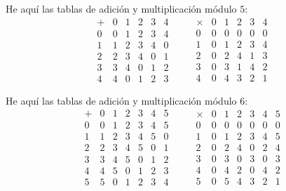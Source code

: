 \documentclass{article}
\begin{document}
\begin{ejemplo}
  He aquí las tablas de adición y multiplicación módulo $5$:
  \[
    \begin{array}{c|ccccc}
      + & 0 & 1 & 2 & 3 & 4 \\
      \hline
      0 & 0 & 1 & 2 & 3 & 4 \\
      1 & 1 & 2 & 3 & 4 & 0 \\
      2 & 2 & 3 & 4 & 0 & 1 \\
      3 & 3 & 4 & 0 & 1 & 2 \\
      4 & 4 & 0 & 1 & 2 & 3
    \end{array}
    \quad\quad
    \begin{array}{c|ccccc}
      \times & 0 & 1 & 2 & 3 & 4 \\
      \hline
      0 & 0 & 0 & 0 & 0 & 0 \\
      1 & 0 & 1 & 2 & 3 & 4 \\
      2 & 0 & 2 & 4 & 1 & 3 \\
      3 & 0 & 3 & 1 & 4 & 2 \\
      4 & 0 & 4 & 3 & 2 & 1
    \end{array}
  \]
\end{ejemplo}

\begin{ejemplo}
  He aquí las tablas de adición y multiplicación módulo $6$:
  \[
    \begin{array}{c|cccccc}
      + & 0 & 1 & 2 & 3 & 4 & 5 \\
      \hline
      0 & 0 & 1 & 2 & 3 & 4 & 5 \\
      1 & 1 & 2 & 3 & 4 & 5 & 0 \\
      2 & 2 & 3 & 4 & 5 & 0 & 1 \\
      3 & 3 & 4 & 5 & 0 & 1 & 2 \\
      4 & 4 & 5 & 0 & 1 & 2 & 3 \\
      5 & 5 & 0 & 1 & 2 & 3 & 4
    \end{array}
    \quad\quad
    \begin{array}{c|cccccc}
      \times & 0 & 1 & 2 & 3 & 4 & 5 \\
      \hline
      0 & 0 & 0 & 0 & 0 & 0 & 0 \\
      1 & 0 & 1 & 2 & 3 & 4 & 5 \\
      2 & 0 & 2 & 4 & 0 & 2 & 4 \\
      3 & 0 & 3 & 0 & 3 & 0 & 3 \\
      4 & 0 & 4 & 2 & 0 & 4 & 2 \\
      5 & 0 & 5 & 4 & 3 & 2 & 1
    \end{array}
  \]
\end{ejemplo}
\end{document}
